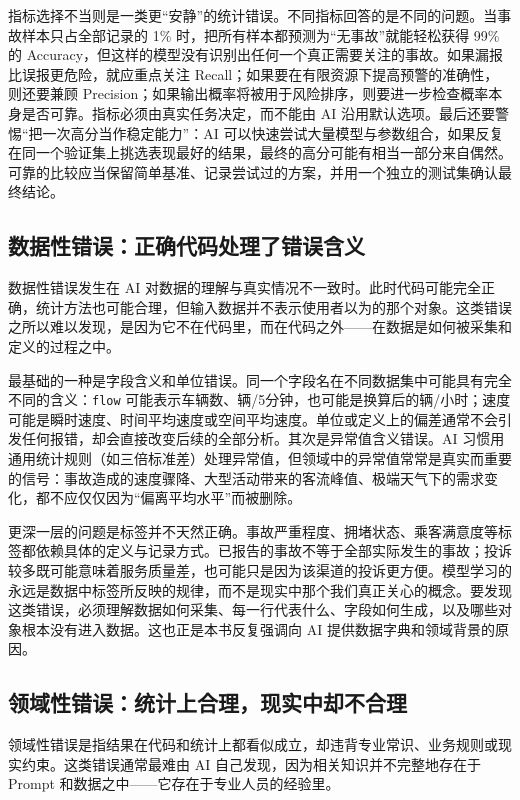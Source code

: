 指标选择不当则是一类更“安静”的统计错误。不同指标回答的是不同的问题。当事故样本只占全部记录的 1\% 时，把所有样本都预测为“无事故”就能轻松获得 99\% 的 Accuracy，但这样的模型没有识别出任何一个真正需要关注的事故。如果漏报比误报更危险，就应重点关注 Recall；如果要在有限资源下提高预警的准确性，则还要兼顾 Precision；如果输出概率将被用于风险排序，则要进一步检查概率本身是否可靠。指标必须由真实任务决定，而不能由 AI 沿用默认选项。最后还要警惕“把一次高分当作稳定能力”：AI 可以快速尝试大量模型与参数组合，如果反复在同一个验证集上挑选表现最好的结果，最终的高分可能有相当一部分来自偶然。可靠的比较应当保留简单基准、记录尝试过的方案，并用一个独立的测试集确认最终结论。

\subsection{数据性错误：正确代码处理了错误含义}

数据性错误发生在 AI 对数据的理解与真实情况不一致时。此时代码可能完全正确，统计方法也可能合理，但输入数据并不表示使用者以为的那个对象。这类错误之所以难以发现，是因为它不在代码里，而在代码之外——在数据是如何被采集和定义的过程之中\cite{sambasivan2021data}。

最基础的一种是字段含义和单位错误。同一个字段名在不同数据集中可能具有完全不同的含义：\texttt{flow} 可能表示车辆数、辆/5分钟，也可能是换算后的辆/小时；速度可能是瞬时速度、时间平均速度或空间平均速度。单位或定义上的偏差通常不会引发任何报错，却会直接改变后续的全部分析。其次是异常值含义错误。AI 习惯用通用统计规则（如三倍标准差）处理异常值，但领域中的异常值常常是真实而重要的信号：事故造成的速度骤降、大型活动带来的客流峰值、极端天气下的需求变化，都不应仅仅因为“偏离平均水平”而被删除。

更深一层的问题是标签并不天然正确。事故严重程度、拥堵状态、乘客满意度等标签都依赖具体的定义与记录方式。已报告的事故不等于全部实际发生的事故；投诉较多既可能意味着服务质量差，也可能只是因为该渠道的投诉更方便。模型学习的永远是数据中标签所反映的规律，而不是现实中那个我们真正关心的概念。要发现这类错误，必须理解数据如何采集、每一行代表什么、字段如何生成，以及哪些对象根本没有进入数据。这也正是本书反复强调向 AI 提供数据字典和领域背景的原因。

\subsection{领域性错误：统计上合理，现实中却不合理}

领域性错误是指结果在代码和统计上都看似成立，却违背专业常识、业务规则或现实约束。这类错误通常最难由 AI 自己发现，因为相关知识并不完整地存在于 Prompt 和数据之中——它存在于专业人员的经验里。

